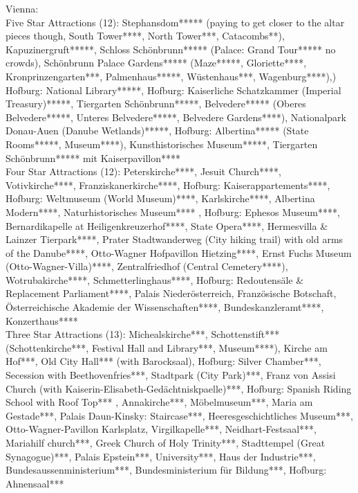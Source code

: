 
Vienna: \\
Five Star Attractions (12): Stephansdom***** (paying to get closer to the altar pieces though, South Tower****, North Tower***, Catacombs**), Kapuzinergruft*****, Schloss Sch\"onbrunn***** (Palace: Grand Tour***** no crowds), Sch\"onbrunn Palace Gardens***** (Maze*****, Gloriette****, Kronprinzengarten***, Palmenhaus*****, W\"ustenhaus***, Wagenburg****),) Hofburg: National Library*****, Hofburg: Kaiserliche Schatzkammer (Imperial Treasury)*****, Tiergarten Sch\"onbrunn*****, Belvedere***** (Oberes Belvedere*****, Unteres Belvedere*****, Belvedere Gardens****), Nationalpark Donau-Auen (Danube Wetlands)*****, Hofburg: Albertina***** (State Rooms*****, Museum****),  Kunsthistorisches Museum*****, Tiergarten Sch\"onbrunn***** mit Kaiserpavillon****\\

Four Star Attractions (12): Peterskirche****, Jesuit Church****, Votivkirche****, Franziskanerkirche****, Hofburg: Kaiserappartements****, Hofburg: Weltmuseum (World Museum)****, Karlskirche****, Albertina Modern****, Naturhistorisches Museum**** , Hofburg: Ephesos Museum****, Bernardikapelle at Heiligenkreuzerhof****, State Opera****, Hermesvilla \& Lainzer Tierpark****, Prater Stadtwanderweg (City hiking trail) with old arms of the Danube****, Otto-Wagner Hofpavillon Hietzing****, Ernst Fuchs Museum (Otto-Wagner-Villa)****, Zentralfriedhof (Central Cemetery****), Wotrubakirche****, Schmetterlinghaus****, Hofburg: Redoutens\"ale \& Replacement Parliament****, Palais Nieder\"osterreich, Franz\"osische Botschaft, \"Osterreichische Akademie der Wissenschaften****, Bundeskanzleramt****, Konzerthaus****\\ 

Three Star Attractions (13):  Michealskirche***, Schottenstift*** (Schottenkirche***, Festival Hall and Library***, Museum****), Kirche am Hof***, Old City Hall*** (with Barocksaal), Hofburg: Silver Chamber***,  Secession with Beethovenfries***, Stadtpark (City Park)***, Franz von Assisi Church (with Kaiserin-Elisabeth-Ged\"achtniskpaelle)***, Hofburg: Spanish Riding School with Roof Top*** , Annakirche***, M\"obelmuseum***, Maria am Gestade***, Palais Daun-Kinsky: Staircase***, Heeresgeschichtliches Museum***, Otto-Wagner-Pavillon Karlsplatz, Virgilkapelle***, Neidhart-Festsaal***, Mariahilf church***, Greek Church of Holy Trinity***, Stadttempel (Great Synagogue)***, Palais Epstein***, University***, Haus der Industrie***, Bundesaussenministerium***, Bundesministerium f\"ur Bildung***, Hofburg: Ahnensaal***\\


